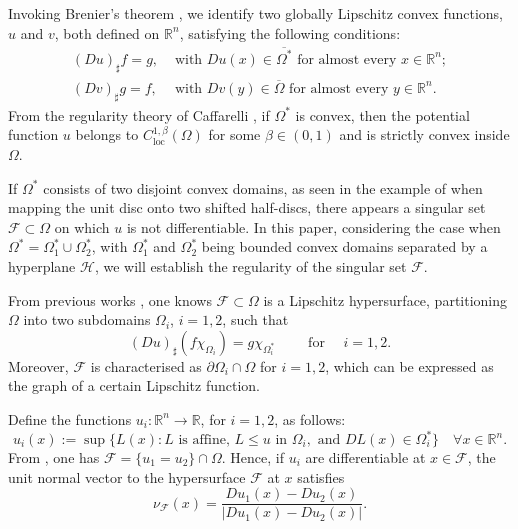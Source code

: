 \documentclass[10pt,a4paper]{amsart}
\theoremstyle{plain}
\newcommand{\0}{\textbf{0}}
\numberwithin{equation}{section}
\numberwithin{equation}{section}
\numberwithin{figure}{section}
\begin{document}
Invoking Brenier's theorem \cite{Br1}, we identify two globally Lipschitz convex functions, $u$ and $v$, both defined on $\mathbb{R}^n$, satisfying the following conditions:
\begin{align}
    (Du)_\sharp f = g, & \text{ with } Du(x) \in \overline{\Omega^*} \text{ for almost every } x \in \mathbb{R}^n; \label{condi1}\\
    (Dv)_\sharp g = f, & \text{ with } Dv(y) \in \overline{\Omega} \text{ for almost every } y \in \mathbb{R}^n. \label{condi2}
\end{align}
From the regularity theory of Caffarelli \cite{C92}, if $\Omega^*$ is convex, then the potential function $u$ belongs to $C^{1,\beta}_{\text{loc}}(\Omega)$ for some $\beta\in(0,1)$ and is strictly convex inside $\Omega$.

If $\Omega^*$ consists of two disjoint convex domains, as seen in the example of \cite{C92} when mapping the unit disc onto two shifted half-discs, there appears a singular set $\mathcal{F}\subset\Omega$ on which $u$ is not differentiable. 
In this paper, considering the case when $\Omega^* = \Omega^*_1 \cup \Omega^*_2$, with $\Omega^*_1$ and $\Omega^*_2$ being bounded convex domains separated by a hyperplane $\mathcal{H}$, we will establish the regularity of the singular set $\mathcal{F}$.

From previous works \cite{CL1, KM1}, one knows $\mathcal{F} \subset \Omega$ is a Lipschitz hypersurface, partitioning $\Omega$ into two subdomains $\Omega_i$, $i = 1, 2$, such that 
	\begin{equation}\label{condi3} 
		(Du)_{\sharp}(f\chi_{\Omega_i}) = g\chi_{\Omega^*_i}\qquad \text{ for }\quad i = 1, 2.
	\end{equation}
Moreover, $\mathcal{F}$ is characterised as $\partial\Omega_i \cap \Omega$ for $i = 1, 2$, which can be expressed as the graph of a certain Lipschitz function.


Define the functions $u_i : \mathbb{R}^n\rightarrow \mathbb{R}$, for $i = 1, 2$, as follows:
	\begin{equation}\label{uidef}
    		u_i(x) := \sup\{L(x) : L \text{ is affine, } L \leq u \text{ in } \Omega_i, \text{ and } DL(x) \in \Omega_i^*\} \quad \forall x\in \mathbb{R}^n.
	\end{equation}
From \cite{CL1, KM1}, one has $\mathcal{F} = \{u_1 = u_2\} \cap \Omega$. 
Hence, if $u_i$ are differentiable at $x \in \mathcal{F}$, the unit normal vector to the hypersurface $\mathcal{F}$ at $x$ satisfies
\begin{equation}\label{gn1} 
    \nu_\mathcal{F}(x) = \frac{Du_1(x) - Du_2(x)}{|Du_1(x) - Du_2(x)|}.
\end{equation}
\end{document}
